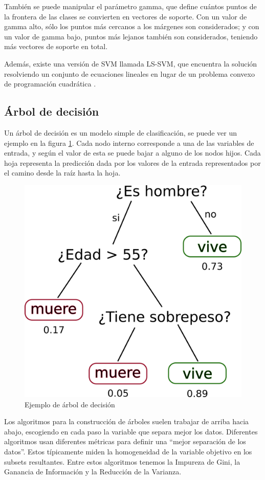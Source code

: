 También se puede manipular el parámetro gamma, que define cuántos puntos de la frontera de las clases se convierten en vectores de soporte. Con un valor de gamma alto, sólo los puntos más cercanos a los márgenes son considerados; y con un valor de gamma bajo, puntos más lejanos también son considerados, teniendo más vectores de soporte en total.

Además, existe una versión de \ac{SVM} llamada \ac{LS-SVM}, que encuentra la solución resolviendo un conjunto de ecuaciones lineales en lugar de un problema convexo de programación cuadrática \citep{ak2002least}.

\subsection{Árbol de decisión}

Un árbol de decisión es un modelo simple de clasificación, se puede ver un ejemplo en la figura \ref{fig:dt-eg}. Cada nodo interno corresponde a una de las variables de entrada, y según el valor de esta se puede bajar a alguno de los nodos hijos. Cada hoja representa la predicción dada por los valores de la entrada representados por el camino desde la raíz hasta la hoja.

\begin{figure}[htbp]
	\centering
	\includegraphics[width=0.4\linewidth]{graficos/propios/arbol_decision.png}
	\caption{Ejemplo de árbol de decisión}
	\label{fig:dt-eg}
\end{figure}

Los algoritmos para la construcción de árboles suelen trabajar de arriba hacia abajo, escogiendo en cada paso la variable que separa mejor los datos. Diferentes algoritmos usan diferentes métricas para definir una ``mejor separación de los datos''. Estos típicamente miden la homogeneidad de la variable objetivo en los subsets resultantes. Entre estos algoritmos tenemos la Impureza de Gini, la Ganancia de Información y la Reducción de la Varianza.

